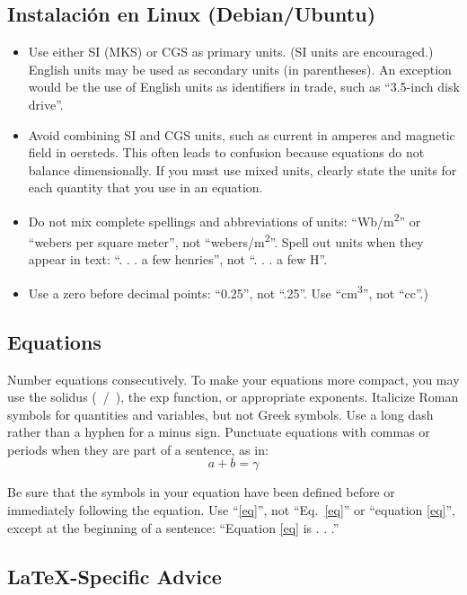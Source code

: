 \documentclass[conference]{IEEEtran}
\begin{document}
\subsection{Instalación en Linux (Debian/Ubuntu)}
\begin{itemize}
\item Use either SI (MKS) or CGS as primary units. (SI units are encouraged.) English units may be used as secondary units (in parentheses). An exception would be the use of English units as identifiers in trade, such as ``3.5-inch disk drive''.
\item Avoid combining SI and CGS units, such as current in amperes and magnetic field in oersteds. This often leads to confusion because equations do not balance dimensionally. If you must use mixed units, clearly state the units for each quantity that you use in an equation.
\item Do not mix complete spellings and abbreviations of units: ``Wb/m\textsuperscript{2}'' or ``webers per square meter'', not ``webers/m\textsuperscript{2}''. Spell out units when they appear in text: ``. . . a few henries'', not ``. . . a few H''.
\item Use a zero before decimal points: ``0.25'', not ``.25''. Use ``cm\textsuperscript{3}'', not ``cc''.)
\end{itemize}

\subsection{Equations}
Number equations consecutively. To make your 
equations more compact, you may use the solidus (~/~), the exp function, or 
appropriate exponents. Italicize Roman symbols for quantities and variables, 
but not Greek symbols. Use a long dash rather than a hyphen for a minus 
sign. Punctuate equations with commas or periods when they are part of a 
sentence, as in:
\begin{equation}
a+b=\gamma\label{eq}
\end{equation}

Be sure that the 
symbols in your equation have been defined before or immediately following 
the equation. Use ``\eqref{eq}'', not ``Eq.~\eqref{eq}'' or ``equation \eqref{eq}'', except at 
the beginning of a sentence: ``Equation \eqref{eq} is . . .''

\subsection{\LaTeX-Specific Advice}
\end{document}
